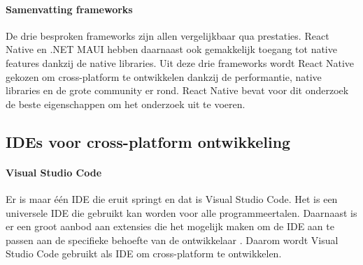 \paragraph{Samenvatting frameworks}
De drie besproken frameworks zijn allen vergelijkbaar qua prestaties. React Native en 
.NET MAUI hebben daarnaast ook gemakkelijk toegang tot native features dankzij de native libraries. 
Uit deze drie frameworks wordt React Native gekozen om cross-platform te ontwikkelen 
dankzij de performantie, native libraries en de grote community er rond. React Native 
bevat voor dit onderzoek de beste eigenschappen om het onderzoek uit te voeren.

\subsection{IDEs voor cross-platform ontwikkeling}
\paragraph{Visual Studio Code}
Er is maar één IDE die eruit springt en dat is Visual Studio Code. Het is een 
universele IDE die gebruikt kan worden voor alle programmeertalen. Daarnaast is er een 
groot aanbod aan extensies die het mogelijk maken om de IDE aan te passen aan de 
specifieke behoefte van de ontwikkelaar \autocite{Heller2022}. Daarom wordt Visual 
Studio Code gebruikt als IDE om cross-platform te ontwikkelen.



